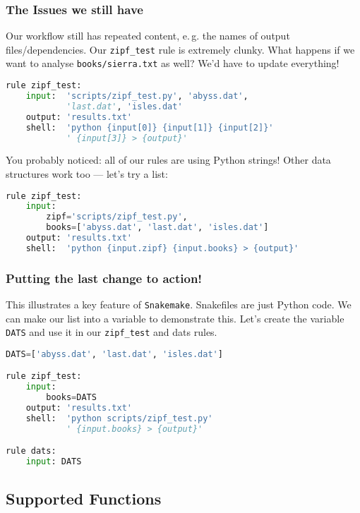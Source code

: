 \begin{frame}[fragile]
  \frametitle{The Issues we still have}
  Our workflow still has repeated content, e.\,g. the names of output files/dependencies. Our \texttt{zipf\_test} rule is extremely clunky. What happens if we want to analyse \texttt{books/sierra.txt} as well? We’d have to update everything!
  \begin{lstlisting}[language=Python,style=Python, basicstyle=\tiny]
rule zipf_test:
    input:  'scripts/zipf_test.py', 'abyss.dat',
            'last.dat', 'isles.dat'
    output: 'results.txt'
    shell:  'python {input[0]} {input[1]} {input[2]}'
            ' {input[3]} > {output}'
  \end{lstlisting}
  You probably noticed: all of our rules are using Python strings! Other data structures work too — let’s try a list:
  \begin{lstlisting}[language=Python,style=Python, basicstyle=\tiny]
rule zipf_test:
    input:
        zipf='scripts/zipf_test.py',
        books=['abyss.dat', 'last.dat', 'isles.dat']
    output: 'results.txt'
    shell:  'python {input.zipf} {input.books} > {output}'
  \end{lstlisting}
\end{frame}

\begin{frame}[fragile]
  \frametitle{Putting the last change to action!}
  This illustrates a key feature of \texttt{Snakemake}. Snakefiles are just Python code. We can make our list into a variable to demonstrate this. Let’s create the variable \texttt{DATS} and use it in our \texttt{zipf\_test} and dats rules.

  \begin{lstlisting}[language=Python,style=Python]
DATS=['abyss.dat', 'last.dat', 'isles.dat']

rule zipf_test:
    input:
        books=DATS
    output: 'results.txt'
    shell:  'python scripts/zipf_test.py'
            ' {input.books} > {output}'

rule dats:
    input: DATS
  \end{lstlisting}
\end{frame}

\subsection{Supported Functions}

